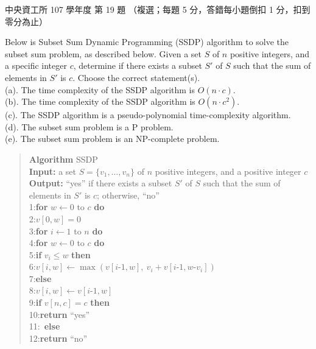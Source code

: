 \begin{pastexam}[label={px:ncu-107-dsa-19}]{中央資工所 107 學年度 第 19 題}
（複選；每題 5 分，答錯每小題倒扣 1 分，扣到零分為止）

Below is Subset Sum Dynamic Programming (SSDP) algorithm to solve the subset sum problem, as
described below. Given a set $S$ of $n$ positive integers, and a specific integer $c$, determine if
there exists a subset $S'$ of $S$ such that the sum of elements in $S'$ is $c$. Choose the correct
statement(s).\\
(a). The time complexity of the SSDP algorithm is $O(n\cdot c)$.\\
(b). The time complexity of the SSDP algorithm is $O(n\cdot c^2)$.\\
(c). The SSDP algorithm is a pseudo-polynomial time-complexity algorithm.\\
(d). The subset sum problem is a P problem.\\
(e). The subset sum problem is an NP-complete problem.
\begin{quote}
\textbf{Algorithm} SSDP\\
\textbf{Input:} a set $S=\{v_1,\ldots,v_n\}$ of $n$ positive integers, and a positive integer $c$\\
\textbf{Output:} ``yes'' if there exists a subset $S'$ of $S$ such that the sum of elements in $S'$
is $c$; otherwise, ``no''\\
1:\quad \textbf{for} $w\leftarrow 0$ to $c$ \textbf{do}\\
2:\quad\quad $v[0,w]=0$\\
3:\quad \textbf{for} $i\leftarrow 1$ to $n$ \textbf{do}\\
4:\quad\quad \textbf{for} $w\leftarrow 0$ to $c$ \textbf{do}\\
5:\quad\quad\quad \textbf{if} $v_i\le w$ \textbf{then}\\
6:\quad\quad\quad\quad $v[i,w]\leftarrow\max(v[i\text{-}1,w],\ v_i+v[i\text{-}1,w\text{-}v_i])$\\
7:\quad\quad\quad \textbf{else}\\
8:\quad\quad\quad\quad $v[i,w]\leftarrow v[i\text{-}1,w]$\\
9:\quad \textbf{if} $v[n,c]=c$ \textbf{then}\\
10:\quad\quad \textbf{return} ``yes''\\
11:\ \textbf{else}\\
12:\quad\quad \textbf{return} ``no''
\end{quote}
\end{pastexam}


